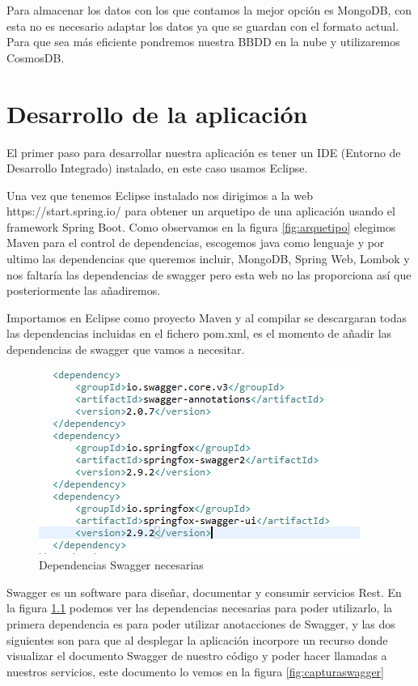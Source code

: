 \documentclass[12pt]{report} %
\begin{document}
Para almacenar los datos con los que contamos la mejor opción es MongoDB, con esta no es necesario adaptar los datos ya que se guardan con el formato actual. Para que sea más eficiente pondremos nuestra BBDD en la nube y utilizaremos CosmosDB.


\chapter{Desarrollo de la aplicación}

El primer paso para desarrollar nuestra aplicación es tener un IDE (Entorno de Desarrollo Integrado) instalado, en este caso usamos Eclipse.

Una vez que tenemos Eclipse instalado nos dirigimos a la web https://start.spring.io/ para obtener un arquetipo de una aplicación usando el framework Spring Boot. Como observamos en la figura \ref{fig:arquetipo} elegimos Maven para el control de dependencias, escogemos java como lenguaje y por ultimo las dependencias que queremos incluir, MongoDB, Spring Web, Lombok y nos faltaría las dependencias de swagger pero esta web no las proporciona así que posteriormente las añadiremos.

Importamos en Eclipse como proyecto Maven y al compilar se descargaran todas las dependencias incluidas en el fichero pom.xml, es el momento de añadir las dependencias de swagger que vamos a necesitar.

\begin{figure}
	\centering
	\includegraphics[width=0.7\linewidth]{imagenes/dependenciasSwagger}
	\caption{Dependencias Swagger necesarias}
	\label{fig:dependenciasswagger}
\end{figure}

Swagger es un software para diseñar, documentar y consumir servicios Rest. En la figura \ref{fig:dependenciasswagger} podemos ver las dependencias necesarias para poder utilizarlo, la primera dependencia es para poder utilizar anotacciones de Swagger, y las dos siguientes son para que al desplegar la aplicación incorpore un recurso donde visualizar el documento Swagger de nuestro código y poder hacer llamadas a nuestros servicios, este documento lo vemos en la figura \ref{fig:capturaswagger}
\end{document}
